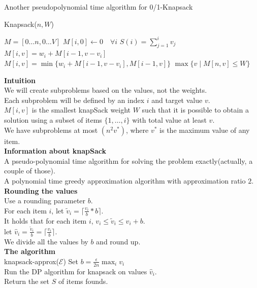 \documentclass[onecolumn]{report}
\begin{document}
Another pseudopolynomial time algorithm for 0/1-Knapsack
\begin{algorithm}[H]
\caption{Knapsack($n,W$)}
\begin{algorithmic}[1]
    \State $M=[0\dots n,0\dots V]$
    \State $M[i,0] \gets 0 \quad \forall i$
        \State $S(i)=\sum_{j=1}^i v_j$
    \EndFor
            \State $M[i,v]=w_i+M[i-1,v-v_i]$
        \Else
            \State $M[i,v]=\min\{w_i+M[i-1,v-v_i],M[i-1,v]\}$
        \EndIf
    \EndFor
    \State \Return $\max\{v \mid M[n,v] \leq W\}$
\end{algorithmic}
\end{algorithm}
\noindent
\textbf{Intuition}\\
We will create subproblems based on the values, not the weights.\\
Each subproblem will be defined by an index $i$ and target value $v$.\\
\indent $M[i,v]$ is the smallest knapSack weight $W$ such that it is possible to obtain a solution using a subset of items $\{1,\dots,i\}$ with total value at least $v$.\\
We have subproblems at most $(n^2v^*)$, where $v^*$ is the maximum value of any item.\\
\textbf{Information about knapSack}\\
A pseudo-polynomial time algorithm for solving the problem exactly(actually, a couple of those).\\
A polynomial time greedy approximation algorithm with approximation ratio $2$.\\
\textbf{Rounding the values}\\
Use a rounding parameter $b$.\\
For each item $i$, let $\tilde{v}_i = \lceil \frac{v_i}{b}*b \rceil$.\\
\indent It holds that for each item $i$, $v_i \leq \tilde{v}_i \leq v_i + b$.\\
\indent let $\hat{v}_i = \frac{\tilde{v}_i}{b}= \lceil \frac{v_i}{b} \rceil$.\\
We divide all the values by $b$ and round up.\\
\textbf{The algorithm}\\
knapsack-approx($\mathcal{E}$)
Set $b=\frac{\epsilon}{2n}\max_i v_i$\\
Run the DP algorithm for knapsack on values $\hat{v}_i$.\\
Return the set $S$ of items founds.\\
\end{document}
